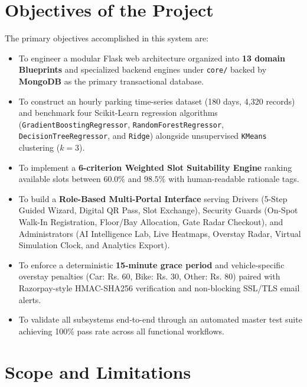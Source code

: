 \documentclass[12pt,a4paper,oneside]{report}
\begin{document}
\section{Objectives of the Project}
The primary objectives accomplished in this system are:
\begin{itemize}[leftmargin=*]
  \item To engineer a modular Flask web architecture organized into \textbf{13 domain Blueprints} and specialized backend engines under \texttt{core/} backed by \textbf{MongoDB} as the primary transactional database.
  \item To construct an hourly parking time-series dataset (180 days, 4,320 records) and benchmark four Scikit-Learn regression algorithms (\texttt{GradientBoostingRegressor}, \texttt{RandomForestRegressor}, \texttt{DecisionTreeRegressor}, and \texttt{Ridge}) alongside unsupervised \texttt{KMeans} clustering ($k=3$).
  \item To implement a \textbf{6-criterion Weighted Slot Suitability Engine} ranking available slots between $60.0\%$ and $98.5\%$ with human-readable rationale tags.
  \item To build a \textbf{Role-Based Multi-Portal Interface} serving Drivers (5-Step Guided Wizard, Digital QR Pass, Slot Exchange), Security Guards (On-Spot Walk-In Registration, Floor/Bay Allocation, Gate Radar Checkout), and Administrators (AI Intelligence Lab, Live Heatmaps, Overstay Radar, Virtual Simulation Clock, and Analytics Export).
  \item To enforce a deterministic \textbf{15-minute grace period} and vehicle-specific overstay penalties (Car: Rs. 60, Bike: Rs. 30, Other: Rs. 80) paired with Razorpay-style HMAC-SHA256 verification and non-blocking SSL/TLS email alerts.
  \item To validate all subsystems end-to-end through an automated master test suite achieving 100\% pass rate across all functional workflows.
\end{itemize}

\section{Scope and Limitations}
\end{document}
